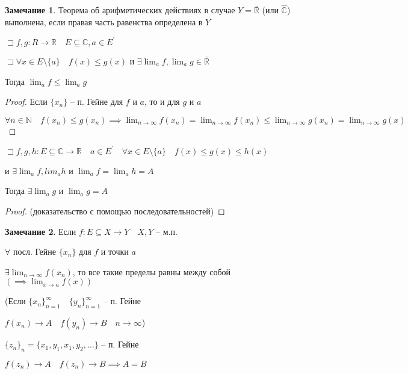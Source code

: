 \documentclass{book}
\newcommand\N{\ensuremath{\mathbb{N}}}
\newcommand\R{\ensuremath{\mathbb{R}}}
\renewcommand\C{\ensuremath{\mathbb{C}}}
\newcommand{\p}[1]{#1^{\prime}}
\newcommand{\ov}[1]{\overline{#1}}
\theoremstyle{definition}
\newtheorem*{note}{Замечание}
\begin{document}
\begin{note}
    Теорема об арифметических действиях в случае $Y = \ov{\R}$ (или $\widehat{\C}$) выполнена, если правая часть равенства определена в $Y$
\end{note}

\begin{theorem}
    $\sqsupset f, g:R\to \R\quad E\subseteq \C, a\in \p E$

    $\sqsupset \forall x\in E\setminus \{a\}\quad f(x)\leqslant g(x)$ и $\exists \lim _af, \lim_ag \in \ov{\R}$

    Тогда $\lim_af\leqslant \lim_ag$
\end{theorem}
\begin{proof}
    Если $\{x_{n} \}$ -- п. Гейне для $f$ и $a$, то и для  $g$  и $a$

    $\forall n\in \N \quad f(x_{n} )\leqslant g(x_{n} )\implies \lim_{n \to \infty} f(x_{n} ) = \lim_{n \to \infty} f(x_{n} )\leqslant \lim_{n \to \infty} g(x_{n} ) = \lim_{n \to \infty} g(x)$
\end{proof}

\begin{theorem}

   $\sqsupset f, g,h :E\subseteq \C\to \R\quad a\in \p E\quad \forall x\in E\setminus \{a\}\quad f(x)\leqslant g(x)\leqslant h(x)$

   и $\exists \lim_af, lim_ah$ и $\lim_af = \lim_ah = A$

   Тогда  $\exists \lim_ag$ и $\lim_ag = A$
\end{theorem}
\begin{proof}
    (доказательство с помощью последовательностей)
\end{proof}

    \begin{note}
        Если $f:E\subseteq X\to Y\quad X, Y$ -- м.п. 

        $\forall $ посл. Гейне $\{x_{n} \}$ для $f$ и точки  $a$

        $\exists \lim_{n \to \infty} f(x_{n} )$, то все такие пределы равны между собой $\left( \implies \lim_{x \to a} f(x) \right) $ 

        (Если $\{x_{n} \}_{n=1}^{\infty }\quad \{y_{n} \}_{n=1}^{\infty }$ -- п. Гейне

        $f(x_{n} )\to A\quad f(y_{n} )\to B\quad n\to \infty $)

        $\{z_n\}_n = \{x_1, y_1, x_1, y_2, \ldots\}$ -- п. Гейне

        $f(z_n)\to A\quad f(z_n)\to B \implies A = B$
    \end{note}
\end{document}
